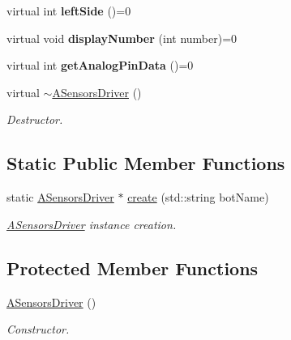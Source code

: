 \begin{DoxyCompactItemize}
virtual int {\bfseries left\+Side} ()=0
\item 
\mbox{\label{classASensorsDriver_a1bbf3fcc72a8d2be97ae9a2237c1627f}} 
virtual void {\bfseries display\+Number} (int number)=0
\item 
\mbox{\label{classASensorsDriver_a13fc25b5cf6629e0324637f7e30d8bd1}} 
virtual int {\bfseries get\+Analog\+Pin\+Data} ()=0
\item 
\mbox{\label{classASensorsDriver_a3371123b03a48e8759f913958d79e777}} 
virtual \hyperlink{classASensorsDriver_a3371123b03a48e8759f913958d79e777}{$\sim$\+A\+Sensors\+Driver} ()
\begin{DoxyCompactList}\small\item\em Destructor. \end{DoxyCompactList}\end{DoxyCompactItemize}
\subsection*{Static Public Member Functions}
\begin{DoxyCompactItemize}
\item 
\mbox{\label{classASensorsDriver_a99eb8ca306862c4119959040e458694f}} 
static \hyperlink{classASensorsDriver}{A\+Sensors\+Driver} $\ast$ \hyperlink{classASensorsDriver_a99eb8ca306862c4119959040e458694f}{create} (std\+::string bot\+Name)
\begin{DoxyCompactList}\small\item\em \hyperlink{classASensorsDriver}{A\+Sensors\+Driver} instance creation. \end{DoxyCompactList}\end{DoxyCompactItemize}
\subsection*{Protected Member Functions}
\begin{DoxyCompactItemize}
\item 
\mbox{\label{classASensorsDriver_a20a532a00130a076584de7a82b406780}} 
\hyperlink{classASensorsDriver_a20a532a00130a076584de7a82b406780}{A\+Sensors\+Driver} ()
\begin{DoxyCompactList}\small\item\em Constructor. \end{DoxyCompactList}\end{DoxyCompactItemize}


